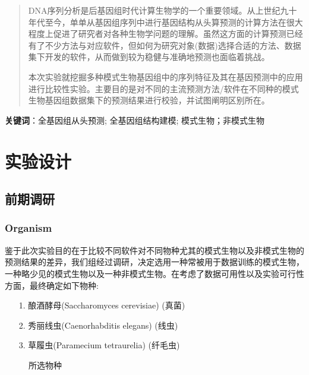\documentclass[12pt]{ctexart}
\begin{document}
\begin{abstract}
DNA序列分析是后基因组时代计算生物学的一个重要领域。从上世纪九十年代至今，单单从基因组序列中进行基因结构从头算预测的计算方法在很大程度上促进了研究者对各种生物学问题的理解。虽然这方面的计算预测已经有了不少方法与对应软件，但如何为研究对象(数据)选择合适的方法、数据集下开发的软件，从而做到较为稳健与准确地预测也面临着挑战。

本次实验就挖掘多种模式生物基因组中的序列特征及其在基因预测中的应用进行比较性实验。主要目的是对不同的主流预测方法/软件在不同种的模式生物基因组数据集下的预测结果进行校验，并试图阐明区别所在。
  
  
\end{abstract}
{\footnotesize {\bf 关键词}：全基因组从头预测; 全基因组结构建模; 模式生物；非模式生物}

\newpage

\tableofcontents 

\newpage

\section{实验设计}

\subsection{前期调研}

\subsubsection{Organism}

鉴于此次实验目的在于比较不同软件对不同物种尤其的模式生物以及非模式生物的预测结果的差异，我们组经过调研，决定选用一种常被用于数据训练的模式生物，一种略少见的模式生物以及一种非模式生物。在考虑了数据可用性以及实验可行性方面，最终确定如下物种:

\begin{itemize}
    \item [1.] 酿酒酵母(Saccharomyces cerevisiae) (真菌)
    \item [2.] 秀丽线虫(Caenorhabditis elegans) (线虫)
    \item [3.] 草履虫(Paramecium tetraurelia) (纤毛虫)
\end{itemize}

\begin{figure}[htbp]
\centering
{}
\quad
{}
\quad
{}
\caption{ 所选物种}
\end{figure}
\end{document}
